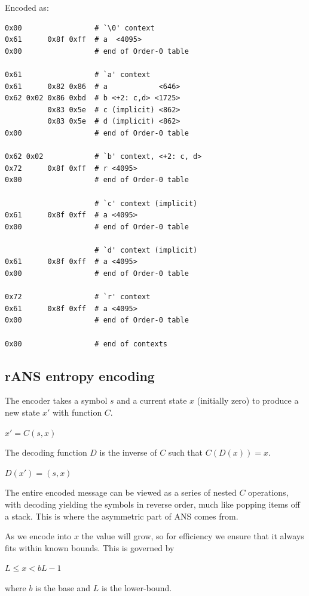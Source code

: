 \documentclass[a4paper]{article}
\begin{document}
Encoded as:
\begin{verbatim}
0x00                 # `\0' context
0x61      0x8f 0xff  # a  <4095>
0x00                 # end of Order-0 table

0x61                 # `a' context
0x61      0x82 0x86  # a            <646>
0x62 0x02 0x86 0xbd  # b <+2: c,d> <1725>
          0x83 0x5e  # c (implicit) <862>
          0x83 0x5e  # d (implicit) <862>
0x00                 # end of Order-0 table

0x62 0x02            # `b' context, <+2: c, d>
0x72      0x8f 0xff  # r <4095>
0x00                 # end of Order-0 table

                     # `c' context (implicit)
0x61      0x8f 0xff  # a <4095>
0x00                 # end of Order-0 table

                     # `d' context (implicit)
0x61      0x8f 0xff  # a <4095>
0x00                 # end of Order-0 table

0x72                 # `r' context
0x61      0x8f 0xff  # a <4095>
0x00                 # end of Order-0 table

0x00                 # end of contexts
\end{verbatim}


\subsection{rANS entropy encoding}

The encoder takes a symbol $s$ and a current state $x$ (initially zero) to
produce a new state $x'$ with function $C$.

{
\setlength{\parindent}{1cm}
\indent $x' = C(s,x)$
}

The decoding function $D$ is the inverse of $C$ such that $C(D(x)) = x$.

{
\setlength{\parindent}{1cm}
\indent $D(x') = (s,x)$
}

The entire encoded message can be viewed as a series of nested $C$
operations, with decoding yielding the symbols in reverse order, much
like popping items off a stack.  This is where the asymmetric part of
ANS comes from.

As we encode into $x$ the value will grow, so for efficiency we ensure
that it always fits within known bounds. This is governed by

{
\setlength{\parindent}{1cm}
\indent $L \leq x < bL-1$
}


where $b$ is the base and $L$ is the lower-bound.
\end{document}
